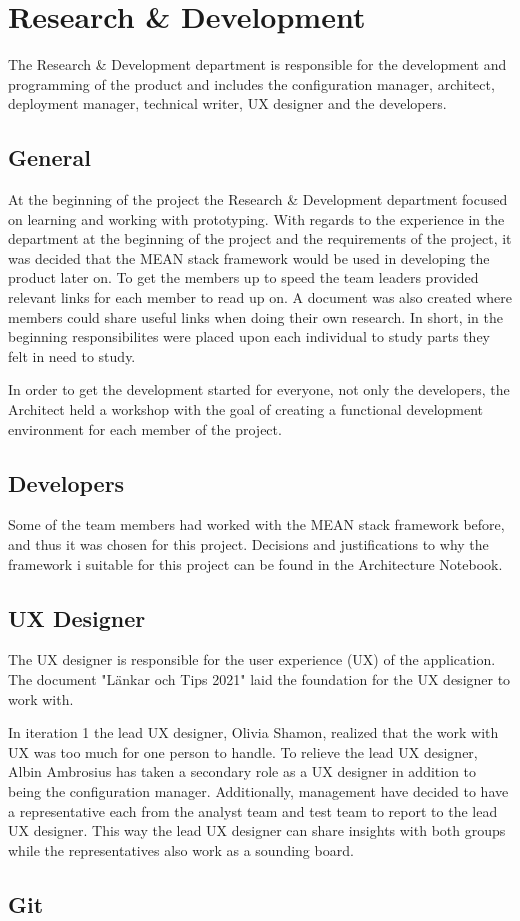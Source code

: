 \section{Research \& Development}
\label{sec:r&d}
The Research \& Development department is responsible for the development and programming of the product and includes the configuration manager, architect, deployment manager, technical writer, UX designer and the developers. 

\subsection{General}
\label{sec:r&d:randgeneral}
At the beginning of the project the Research \& Development department focused on learning and working with prototyping. With regards to the experience in the department at the beginning of the project and the requirements of the project, it was decided that the MEAN stack framework would be used in developing the product later on. To get the members up to speed the team leaders provided relevant links for each member to read up on. A document was also created where members could share useful links when doing their own research. In short, in the beginning responsibilites were placed upon each individual to study parts they felt in need to study.

In order to get the development started for everyone, not only the developers, the Architect held a workshop with the goal of creating a functional development environment for each member of the project. 

\subsection{Developers}
\label{sec:r&d:developers}
Some of the team members had worked with the MEAN stack framework before, and thus it was chosen for this project. Decisions and justifications to why the framework i suitable for this project can be found in the Architecture Notebook.


\subsection{UX Designer}
\label{sec:r&d:ux}
The UX designer is responsible for the user experience (UX) of the application. The document "Länkar och Tips 2021" laid the foundation for the UX designer to work with. 

In iteration 1 the lead UX designer, Olivia Shamon, realized that the work with UX was too much for one person to handle. To relieve the lead UX designer, Albin Ambrosius has taken a secondary role as a UX designer in addition to being the configuration manager. Additionally, management have decided to have a representative each from the analyst team and test team to report to the lead UX designer. This way the lead UX designer can share insights with both groups while the representatives also work as a sounding board. 

\subsection{Git}
\label{sec:r&d:git}

